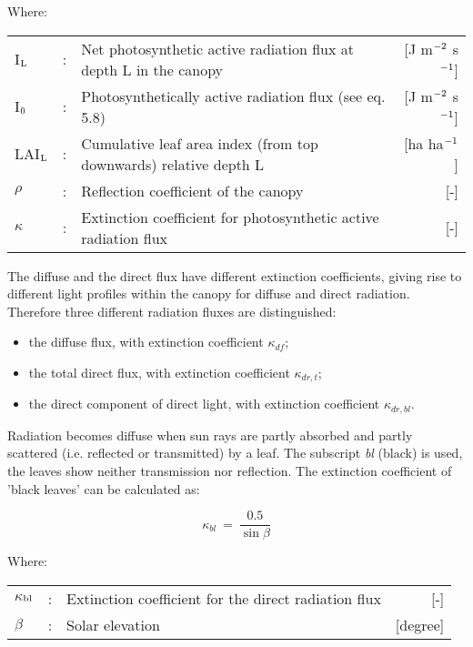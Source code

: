 Where:\\[5pt]
\begin{tabularx}{\textwidth}{llXr}
I$_{{\rm L}}$   &:& Net photosynthetic active radiation flux at 
    depth L in the canopy    &    [J m$^{{\rm -2}}$ s$^{{\rm -1}}$]\\
I$_{{\rm 0}}$   &:& Photosynthetically active radiation flux (see eq. 5.8)  & 
    [J m$^{{\rm -2}}$ s$^{{\rm -1}}$]\\
LAI$_{{\rm L}}$ &:& Cumulative leaf area index (from top downwards) 
    relative depth L & [ha ha$^{{\rm -1}}$]\\
$\rho$          &:& Reflection coefficient of the canopy   &     [-]\\
$\kappa$        &:& Extinction coefficient for photosynthetic active 
    radiation flux   &     [-]\\
\end{tabularx}

The diffuse and the direct flux have different extinction coefficients, giving rise to
different light profiles within the canopy for diffuse and direct radiation. Therefore three
different radiation fluxes are distinguished:
\begin{itemize}
\item the diffuse flux, with extinction coefficient $\kappa_{df}$;
\item the total direct flux, with extinction coefficient $\kappa_{dr,t}$;
\item the direct component of direct light, with extinction coefficient $\kappa_{dr,bl}$.
\end{itemize}

Radiation becomes diffuse when sun rays are partly absorbed and partly scattered (i.e.
reflected or transmitted) by a leaf. The subscript {\it bl} (black) is used, the leaves show
neither transmission nor reflection. The extinction coefficient of 'black leaves'
can be calculated as:

\begin{equation}
\kappa_{bl} ~=~{\frac{0.5}{\sin \beta }}
\end{equation}

Where:\\[5pt]
\begin{tabularx}{\textwidth}{llXr}
$\kappa$$_{{\rm bl}}$ &:& Extinction coefficient for the direct radiation flux   &     [-]\\
$\beta$ &:& Solar elevation    &    [degree]\\
\end{tabularx}

